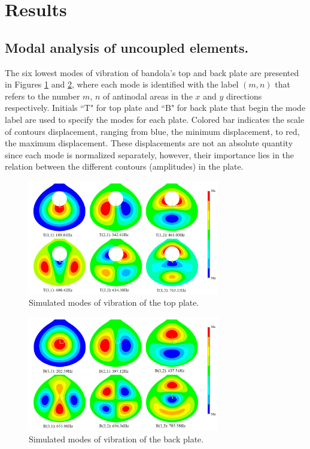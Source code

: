 \section{Results}

\subsection{Modal analysis of uncoupled elements.}

The six lowest modes of vibration of bandola's top and back plate are presented in Figures \ref{TopPlateModes} and \ref{BackPlateModes}, where each mode is identified with the label $(m, n)$ that refers to the number $m$, $n$ of antinodal areas in the $x$ and $y$ directions respectively. Initials ``T" for top plate and ``B" for back plate that begin the mode label are used to specify the modes for each plate. Colored bar indicates the scale of contours displacement, ranging from blue, the minimum displacement, to red, the maximum displacement. These displacements are not an absolute quantity since each mode is normalized separately, however, their importance lies in the relation between the different contours (amplitudes) in the plate.

\begin{figure}[h]
\centering
\includegraphics[height=5cm]{img/TopPlateModes.png}
\caption{Simulated modes of vibration of the top plate.}
\label{TopPlateModes}
\end{figure}

\begin{figure}[h]
\centering
\includegraphics[height=5cm]{img/BackPlateModes.png}
\caption{Simulated modes of vibration of the back plate.}
\label{BackPlateModes}
\end{figure}

